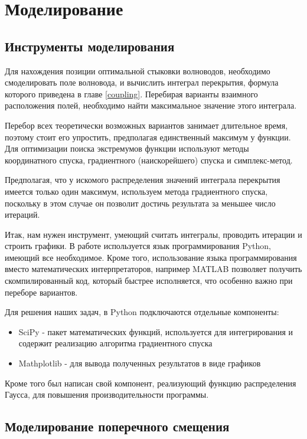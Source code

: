 \chapter{Моделирование}
\section{Инструменты моделирования}
Для нахождения позиции оптимальной стыковки волноводов, необходимо смоделировать поле волновода, и вычислить интеграл перекрытия, формула которого приведена в главе \ref{coupling}. Перебирая варианты взаимного расположения полей, необходимо найти максимальное значение этого интеграла.

Перебор всех теоретически возможных вариантов занимает длительное время, поэтому стоит его упростить, предполагая единственный максимум у функции. Для оптимизации поиска экстремумов функции используют методы координатного спуска, градиентного (наискорейшего) спуска и симплекс-метод.\cite{numeric} 

Предполагая, что у искомого распределения значений интеграла перекрытия имеется только один максимум, используем метода градиентного спуска, поскольку в этом случае он позволит достичь результата за меньшее число итераций. \cite{mathews}

Итак, нам нужен инструмент, умеющий считать интегралы, проводить итерации и строить графики. В работе используется язык программирования Python, имеющий все необходимое. Кроме того, использование языка программирования вместо математических интерпретаторов, например MATLAB позволяет получить скомпилированный код, который быстрее исполняется, что особенно важно при переборе вариантов.

Для решения наших задач, в Python подключаются отдельные компоненты:
\begin{itemize}
	\item SciPy - пакет математических функций, используется для интегрирования и содержит реализацию алгоритма градиентного спуска
	\item Mathplotlib - для вывода полученных результатов в виде графиков
\end{itemize}

Кроме того был написан свой компонент, реализующий функцию распределения Гаусса, для повышения производительности программы.

\section{Моделирование поперечного смещения}

